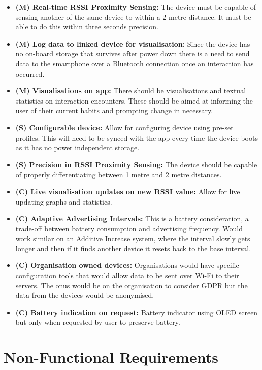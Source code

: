 \documentclass{l4proj}
\begin{document}
\begin{itemize}
    \item \textbf{(M) Real-time RSSI Proximity Sensing: } The device must be capable of sensing another of the same device to within a 2 metre distance. It must be able to do this within three seconds precision.
    \item \textbf{(M) Log data to linked device for visualisation: } Since the device has no on-board storage that survives after power down there is a need to send data to the smartphone over a Bluetooth connection once an interaction has occurred.
    \item \textbf{(M) Visualisations on app: } There should be visualisations and textual statistics on interaction encounters. These should be aimed at informing the user of their current habits and prompting change in necessary.
    \item \textbf{(S) Configurable device: } Allow for configuring device using pre-set profiles. This will need to be synced with the app every time the device boots as it has no power independent storage.
    \item \textbf{(S) Precision in RSSI Proximity Sensing: } The device should be capable of properly differentiating between 1 metre and 2 metre distances.
    \item \textbf{(C) Live visualisation updates on new RSSI value: } Allow for live updating graphs and statistics.
    \item \textbf{(C) Adaptive Advertising Intervals: } This is a battery consideration, a trade-off between battery consumption and advertising frequency. Would work similar on an Additive Increase system, where the interval slowly gets longer and then if it finds another device it resets back to the base interval.
    \item \textbf{(C) Organisation owned devices: } Organisations would have specific configuration tools that would allow data to be sent over Wi-Fi to their servers. The onus would be on the organisation to consider GDPR but the data from the devices would be anonymised.
    \item \textbf{(C) Battery indication on request: } Battery indicator using OLED screen but only when requested by user to preserve battery.
\end{itemize}

\section{Non-Functional Requirements}
\end{document}
